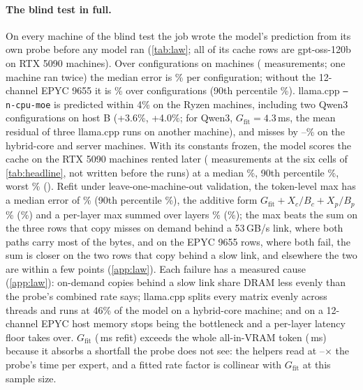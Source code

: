 \paragraph{The blind test in full.} On every machine of the blind test the job wrote the model's prediction from its own
probe before any model ran (\cref{tab:law}; all of its cache rows are gpt-oss-120b on RTX 5090 machines). Over
\lawCfg{} configurations on \lawHosts{} machines (\lawMeas{} measurements; one machine ran twice) the median error is
\lawMedian\% per configuration; without the 12-channel EPYC 9655 it is \lawDeskMedian\% over \lawDeskN{}
configurations (90th percentile \lawDeskPninety\%). llama.cpp \texttt{--n-cpu-moe} is predicted within 4\% on the
Ryzen machines, including two Qwen3 configurations on host B (+3.6\%, +4.0\%; for Qwen3, $G_{\mathrm{fit}}{=}4.3$\,ms, the mean
residual of three llama.cpp runs on another machine), and misses by \lawLlamaOffMin--\lawLlamaOffMax\% on the
hybrid-core and server machines. With its constants frozen, the model scores the cache on the \lawFrozenHosts{} RTX 5090
machines rented later (\lawFrozenN{} measurements at the six cells of \cref{tab:headline}, not written before the runs)
at a median \lawFrozenMed\%, 90th percentile \lawFrozenPninety\%, worst \lawFrozenMax\% (\lawFrozenWorstCell).
Refit under leave-one-machine-out validation, the token-level max has a median error of \lohoMaxMed\% (90th percentile
\lohoMaxPninety\%), the additive form $G_{\mathrm{fit}}+X_c/B_c+X_p/B_p$ \lohoAddMed\% (\lohoAddPninety\%) and a per-layer max summed
over layers \lohoLayerMed\% (\lohoLayerPninety\%); the max beats the sum on the three rows that copy misses on
demand behind a 53\,GB/s link, where both paths carry most of the bytes, and on the EPYC 9655 rows, where both fail,
the sum is closer on the two rows that copy behind a slow link, and elsewhere the two are within a few points
(\cref{app:law}). Each failure has a
measured cause (\cref{app:law}): on-demand copies behind a slow link share DRAM less evenly than the probe's combined
rate says; llama.cpp splits every matrix evenly across threads and runs at 46\% of the model on a hybrid-core machine; and
on a 12-channel EPYC host memory stops being the bottleneck and a per-layer latency floor takes over. $G_{\mathrm{fit}}$
(\lawGRefit\,ms refit) exceeds the whole all-in-VRAM token (\vramMs\,ms) because it absorbs a shortfall the probe does
not see: the helpers read at \helperRateMin--\helperRateMax$\times$ the probe's time per expert, and a fitted rate
factor is collinear with $G_{\mathrm{fit}}$ at this sample size.

